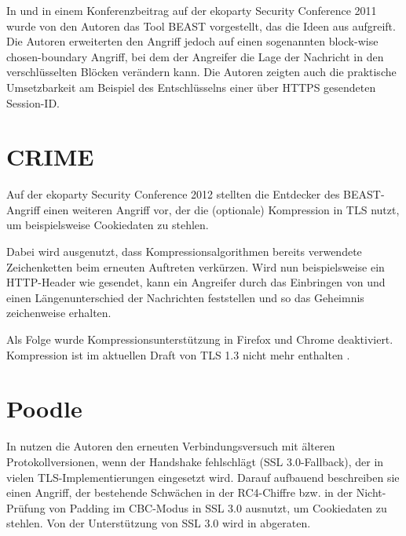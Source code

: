 In \cite{duong11} und in einem Konferenzbeitrag auf der ekoparty Security Conference 2011 wurde von den Autoren das Tool BEAST vorgestellt, das die Ideen aus \cite{bard04} aufgreift. Die Autoren erweiterten den Angriff jedoch auf einen sogenannten block-wise chosen-boundary Angriff, bei dem der Angreifer die Lage der Nachricht in den verschlüsselten Blöcken verändern kann. Die Autoren zeigten auch die praktische Umsetzbarkeit am Beispiel des Entschlüsselns einer über HTTPS gesendeten Session-ID.


\section{CRIME}

\label{sec_attack_crime}

Auf der ekoparty Security Conference 2012 stellten die Entdecker des BEAST-Angriff einen weiteren Angriff vor, der die (optionale) Kompression in TLS nutzt, um beispielsweise Cookiedaten zu stehlen. 

Dabei wird ausgenutzt, dass Kompressionsalgorithmen bereits verwendete Zeichenketten beim erneuten Auftreten verkürzen. Wird nun beispielsweise ein HTTP-Header wie  gesendet, kann ein Angreifer durch das Einbringen von  und  einen Längenunterschied der Nachrichten feststellen und so das Geheimnis zeichenweise erhalten.

Als Folge wurde Kompressionsunterstützung in Firefox und Chrome deaktiviert. Kompression ist im aktuellen Draft von TLS 1.3 nicht mehr enthalten \cite{tls13}.

\section{Poodle}

In \cite{moeller14} nutzen die Autoren den erneuten Verbindungsversuch mit älteren Protokollversionen, wenn der Handshake fehlschlägt (SSL 3.0-Fallback), der in vielen TLS-Implementierungen eingesetzt wird. Darauf aufbauend beschreiben sie einen Angriff, der bestehende Schwächen in der RC4-Chiffre  bzw. in der Nicht-Prüfung von Padding im CBC-Modus in SSL 3.0 ausnutzt, um Cookiedaten zu stehlen.
Von der Unterstützung von SSL 3.0 wird in \cite{deprecate_ssl30} abgeraten.

